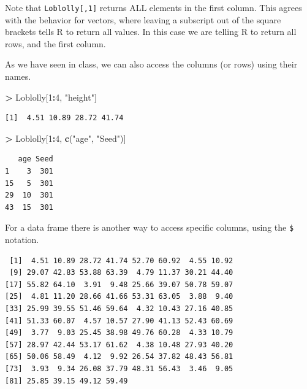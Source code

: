 \documentclass[]{krantz}
\makeatletter
\newenvironment{Shaded}{\begin{snugshade}}{\end{snugshade}}
\newcommand{\KeywordTok}[1]{\textcolor[rgb]{0.27,0.27,0.27}{\textbf{#1}}}
\newcommand{\DecValTok}[1]{\textcolor[rgb]{0.06,0.06,0.06}{#1}}
\newcommand{\StringTok}[1]{\textcolor[rgb]{0.5,0.5,0.5}{#1}}
\newcommand{\OperatorTok}[1]{\textcolor[rgb]{0.43,0.43,0.43}{\textbf{#1}}}
\newcommand{\NormalTok}[1]{#1}
\newenvironment{kframe}{%
\medskip{}
\setlength{\fboxsep}{.8em}
 \def\at@end@of@kframe{}%
 \ifinner\ifhmode%
  \def\at@end@of@kframe{\end{minipage}}%
  \begin{minipage}{\columnwidth}%
 \fi\fi%
 \def\FrameCommand##1{\hskip\@totalleftmargin \hskip-\fboxsep
 \colorbox{shadecolor}{##1}\hskip-\fboxsep
     \hskip-\linewidth \hskip-\@totalleftmargin \hskip\columnwidth}%
 \MakeFramed {\advance\hsize-\width
   \@totalleftmargin\z@ \linewidth\hsize
   \@setminipage}}%
 {\par\unskip\endMakeFramed%
 \at@end@of@kframe}
\renewenvironment{Shaded}{\begin{kframe}}{\end{kframe}}
\theoremstyle{definition}
\theoremstyle{definition}
\theoremstyle{definition}
\theoremstyle{remark}
\makeatother
\begin{document}
Note that \texttt{Loblolly{[},1{]}} returns ALL elements in the first
column. This agrees with the behavior for vectors, where leaving a
subscript out of the square brackets tells R to return all values. In
this case we are telling R to return all rows, and the first column.

As we have seen in class, we can also access the columns (or rows) using
their names.

\begin{Shaded}
\begin{Highlighting}[]
\OperatorTok{>}\StringTok{ }\NormalTok{Loblolly[}\DecValTok{1}\OperatorTok{:}\DecValTok{4}\NormalTok{, }\StringTok{"height"}\NormalTok{]}
\end{Highlighting}
\end{Shaded}

\begin{verbatim}
[1]  4.51 10.89 28.72 41.74
\end{verbatim}

\begin{Shaded}
\begin{Highlighting}[]
\OperatorTok{>}\StringTok{ }\NormalTok{Loblolly[}\DecValTok{1}\OperatorTok{:}\DecValTok{4}\NormalTok{, }\KeywordTok{c}\NormalTok{(}\StringTok{"age"}\NormalTok{, }\StringTok{"Seed"}\NormalTok{)]}
\end{Highlighting}
\end{Shaded}

\begin{verbatim}
   age Seed
1    3  301
15   5  301
29  10  301
43  15  301
\end{verbatim}

For a data frame there is another way to access specific columns, using
the \texttt{\$} notation.

\begin{Shaded}
\end{Shaded}

\begin{verbatim}
 [1]  4.51 10.89 28.72 41.74 52.70 60.92  4.55 10.92
 [9] 29.07 42.83 53.88 63.39  4.79 11.37 30.21 44.40
[17] 55.82 64.10  3.91  9.48 25.66 39.07 50.78 59.07
[25]  4.81 11.20 28.66 41.66 53.31 63.05  3.88  9.40
[33] 25.99 39.55 51.46 59.64  4.32 10.43 27.16 40.85
[41] 51.33 60.07  4.57 10.57 27.90 41.13 52.43 60.69
[49]  3.77  9.03 25.45 38.98 49.76 60.28  4.33 10.79
[57] 28.97 42.44 53.17 61.62  4.38 10.48 27.93 40.20
[65] 50.06 58.49  4.12  9.92 26.54 37.82 48.43 56.81
[73]  3.93  9.34 26.08 37.79 48.31 56.43  3.46  9.05
[81] 25.85 39.15 49.12 59.49
\end{verbatim}
\end{document}
